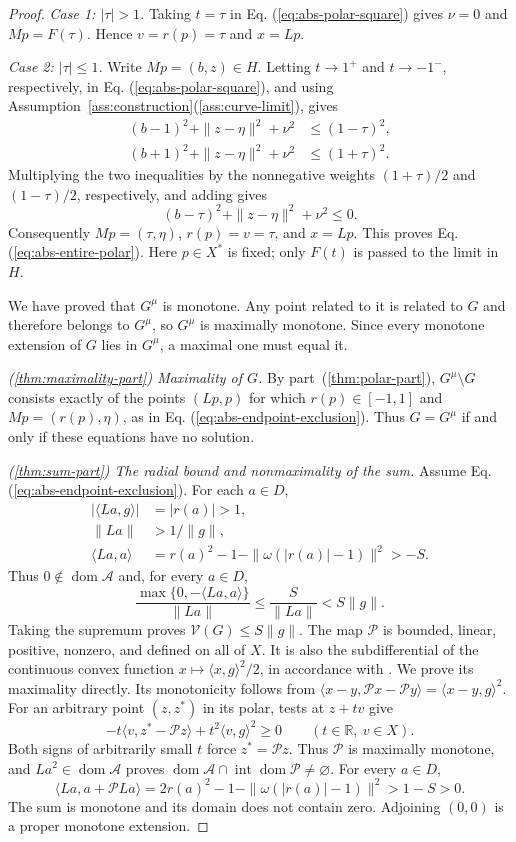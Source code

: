 \documentclass[11pt]{article}
\newcommand{\R}{\mathbb R}
\newcommand{\dom}{\operatorname{dom}}
\newcommand{\pair}[2]{\langle #1,#2\rangle}
\theoremstyle{definition}
\theoremstyle{remark}
\begin{document}
\begin{proof}
\emph{Case 1: $|\tau|>1$.} Taking $t=\tau$ in Eq. (\ref{eq:abs-polar-square}) gives $\nu=0$ and $Mp=F(\tau)$. Hence $v=r(p)=\tau$ and $x=Lp$.

\emph{Case 2: $|\tau|\le1$.} Write $Mp=(b,z)\in H$. Letting $t\to1^+$ and $t\to-1^-$, respectively, in Eq. (\ref{eq:abs-polar-square}), and using Assumption~\ref{ass:construction}\textup{(\ref{ass:curve-limit})}, gives
\[
\begin{aligned}
(b-1)^2+\|z-\eta\|^2+\nu^2&\le(1-\tau)^2,\\
(b+1)^2+\|z-\eta\|^2+\nu^2&\le(1+\tau)^2.
\end{aligned}
\]
Multiplying the two inequalities by the nonnegative weights $(1+\tau)/2$ and $(1-\tau)/2$, respectively, and adding gives
\[
(b-\tau)^2+\|z-\eta\|^2+\nu^2\le0.
\]
Consequently $Mp=(\tau,\eta)$, $r(p)=v=\tau$, and $x=Lp$. This proves Eq. (\ref{eq:abs-entire-polar}). Here $p\in X^*$ is fixed; only $F(t)$ is passed to the limit in $H$.

We have proved that $G^\mu$ is monotone. Any point related to it is related to $G$ and therefore belongs to $G^\mu$, so $G^\mu$ is maximally monotone. Since every monotone extension of $G$ lies in $G^\mu$, a maximal one must equal it.

\noindent\textit{\textup{(\ref{thm:maximality-part})} Maximality of $G$.}
By part~\textup{(\ref{thm:polar-part})}, $G^\mu\setminus G$ consists exactly of the points $(Lp,p)$ for which $r(p)\in[-1,1]$ and $Mp=(r(p),\eta)$, as in Eq. (\ref{eq:abs-endpoint-exclusion}). Thus $G=G^\mu$ if and only if these equations have no solution.

\noindent\textit{\textup{(\ref{thm:sum-part})} The radial bound and nonmaximality of the sum.}
Assume Eq. (\ref{eq:abs-endpoint-exclusion}). For each $a\in D$,
\[
\begin{aligned}
|\pair{La}{g}|&=|r(a)|>1,\\
\|La\|&>1/\|g\|,\\
\pair{La}{a}&=r(a)^2-1-\|\omega(|r(a)|-1)\|^2>-S.
\end{aligned}
\]
Thus $0\notin\dom\mathcal A$ and, for every $a\in D$,
\[
\frac{\max\{0,-\pair{La}{a}\}}{\|La\|}
\le\frac{S}{\|La\|}<S\|g\|.
\]
Taking the supremum proves $\mathcal V(G)\le S\|g\|$. The map $\mathcal P$ is bounded, linear, positive, nonzero, and defined on all of $X$. It is also the subdifferential of the continuous convex function $x\mapsto\pair{x}{g}^2/2$, in accordance with \cite{rockafellar1970subdiff}. We prove its maximality directly. Its monotonicity follows from $\pair{x-y}{\mathcal Px-\mathcal Py}=\pair{x-y}{g}^2$. For an arbitrary point $(z,z^*)$ in its polar, tests at $z+tv$ give
\[
-t\pair{v}{z^*-\mathcal Pz}+t^2\pair{v}{g}^2\ge0
\qquad(t\in\R,\ v\in X).
\]
Both signs of arbitrarily small $t$ force $z^*=\mathcal Pz$. Thus $\mathcal P$ is maximally monotone, and $La^2\in\dom\mathcal A$ proves $\dom\mathcal A\cap\operatorname{int}\dom\mathcal P\ne\varnothing$. For every $a\in D$,
\[
\pair{La}{a+\mathcal PLa}
=2r(a)^2-1-\|\omega(|r(a)|-1)\|^2>1-S>0.
\]
The sum is monotone and its domain does not contain zero. Adjoining $(0,0)$ is a proper monotone extension.
\end{proof}
\end{document}
